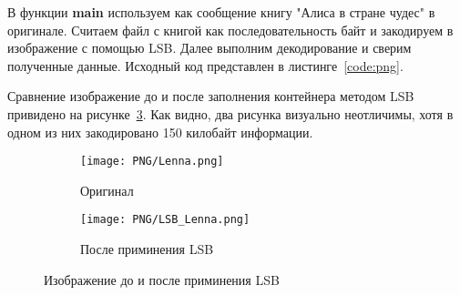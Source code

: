В функции \textbf{main} используем как сообщение книгу "Алиса в стране чудес" в оригинале.
Считаем файл с книгой как последовательность байт и закодируем в изображение с помощью LSB.
Далее выполним декодирование и сверим полученные данные.
Исходный код представлен в листинге~\ref{code:png}.

Сравнение изображение до и после заполнения контейнера методом LSB
привидено на рисунке~\ref{img:lsb}.
Как видно, два рисунка визуально неотличимы,
хотя в одном из них закодировано 150 килобайт информации.
\begin{figure}[ht!]
    \centering
    \begin{subfigure}{.5\textwidth}
      \centering
      \texttt{[image: PNG/Lenna.png]}
      \caption{Оригинал}
      \label{img:lenna-png}
    \end{subfigure}%
    \begin{subfigure}{.5\textwidth}
      \centering
      \texttt{[image: PNG/LSB\_Lenna.png]}
      \caption{После приминения LSB}
      \label{img:lenna-lsb}
    \end{subfigure}
    \caption{Изображение до и после приминения LSB}
    \label{img:lsb}
\end{figure}